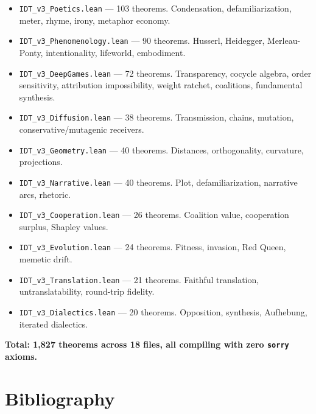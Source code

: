 \documentclass[11pt,oneside]{book}
\theoremstyle{plain}
\theoremstyle{definition}
\theoremstyle{remark}
\begin{document}
\begin{itemize}
\item \texttt{IDT\_v3\_Poetics.lean} --- 103 theorems. Condensation,
defamiliarization, meter, rhyme, irony, metaphor economy.

\item \texttt{IDT\_v3\_Phenomenology.lean} --- 90 theorems. Husserl,
Heidegger, Merleau-Ponty, intentionality, lifeworld, embodiment.

\item \texttt{IDT\_v3\_DeepGames.lean} --- 72 theorems. Transparency,
cocycle algebra, order sensitivity, attribution impossibility, weight ratchet,
coalitions, fundamental synthesis.

\item \texttt{IDT\_v3\_Diffusion.lean} --- 38 theorems. Transmission,
chains, mutation, conservative/mutagenic receivers.

\item \texttt{IDT\_v3\_Geometry.lean} --- 40 theorems. Distances,
orthogonality, curvature, projections.

\item \texttt{IDT\_v3\_Narrative.lean} --- 40 theorems. Plot, defamiliarization,
narrative arcs, rhetoric.

\item \texttt{IDT\_v3\_Cooperation.lean} --- 26 theorems. Coalition value,
cooperation surplus, Shapley values.

\item \texttt{IDT\_v3\_Evolution.lean} --- 24 theorems. Fitness, invasion,
Red Queen, memetic drift.

\item \texttt{IDT\_v3\_Translation.lean} --- 21 theorems. Faithful translation,
untranslatability, round-trip fidelity.

\item \texttt{IDT\_v3\_Dialectics.lean} --- 20 theorems. Opposition,
synthesis, Aufhebung, iterated dialectics.
\end{itemize}

\noindent\textbf{Total: 1,827 theorems across 18 files, all compiling with zero
\texttt{sorry} axioms.}

\chapter*{Bibliography}
\end{document}
